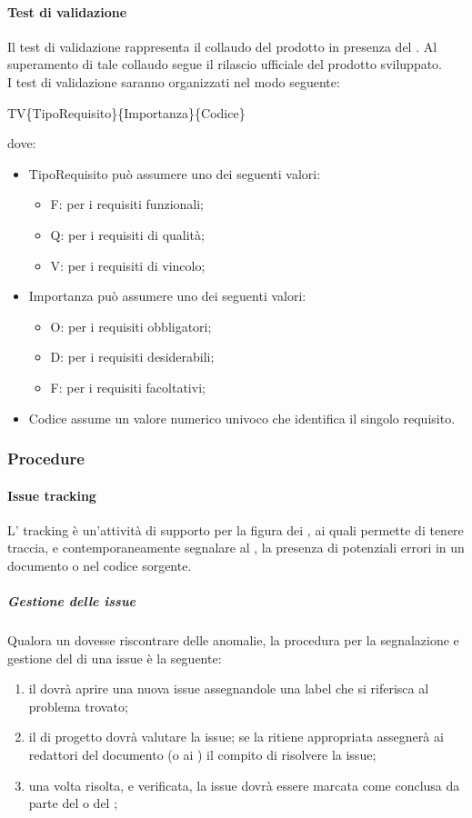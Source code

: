 \paragraph{Test di validazione}
Il test di validazione rappresenta il collaudo del prodotto in presenza del . Al
superamento di tale collaudo segue il rilascio ufficiale del prodotto sviluppato.\\
I test di validazione saranno organizzati nel modo seguente: \\
\begin{center} TV\{TipoRequisito\}\{Importanza\}\{Codice\} \end{center}
dove:
\begin{itemize}
	\item TipoRequisito può assumere uno dei seguenti valori:
	\begin{itemize}
		\item F: per i requisiti funzionali;
		\item Q: per i requisiti di qualità;
		\item V: per i requisiti di vincolo;
	\end{itemize}
	\item Importanza può assumere uno dei seguenti valori:
	\begin{itemize}
		\item O: per i requisiti obbligatori;
		\item D: per i requisiti desiderabili;
		\item F: per i requisiti facoltativi;
	\end{itemize}
	\item Codice assume un valore numerico univoco che identifica il singolo requisito.
\end{itemize}

\subsubsection{Procedure}
\paragraph{Issue tracking}
L' tracking è un'attività di supporto per la figura dei \VERP, ai quali permette di tenere traccia, e contemporaneamente segnalare al \RESP, la presenza di potenziali errori in un documento o nel codice sorgente.
 \subparagraph{Gestione delle issue}
Qualora un \VER{} dovesse riscontrare delle anomalie, la procedura per la segnalazione e gestione del  di una issue è la seguente:
\begin{enumerate}
	\item il \VER{} dovrà aprire una nuova issue assegnandole una label che si riferisca al problema trovato;
	\item il \RESP{} di progetto dovrà valutare la issue; se la ritiene appropriata assegnerà ai redattori del documento (o ai \PRP) il compito di risolvere la issue;
	\item una volta risolta, e verificata, la issue dovrà essere marcata come conclusa da parte del \RESP{} o del \VER;
\end{enumerate}
